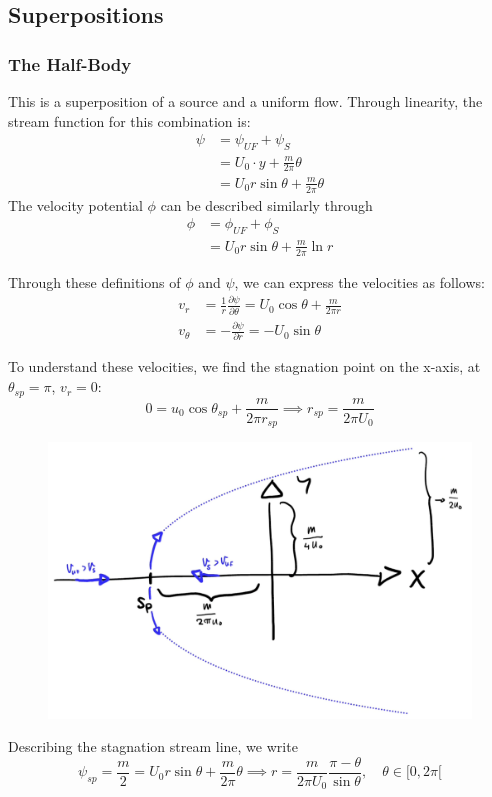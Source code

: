 \subsection{Superpositions}
\subsubsection{The Half-Body}
This is a superposition of a source and a uniform flow.
Through linearity, the stream function for this combination is:
\begin{equation*}
	\begin{split}
		\psi &= \psi_{UF} + \psi_{S}\\
		&= U_0\cdot y + \frac{m}{2\pi}\theta \\
		&= U_0r\sin\theta + \frac{m}{2\pi}\theta
	\end{split}
\end{equation*}
The velocity potential $\phi$ can be described similarly through
\begin{equation*}
	\begin{split}
		\phi &= \phi_{UF} + \phi_{S}\\
		&=U_0r\sin\theta + \frac{m}{2\pi}\ln r 
	\end{split}
\end{equation*}

Through these definitions of $\phi$ and $\psi$, we can express the velocities as follows:
\begin{equation*}
	\begin{split}
		v_r &= \frac 1r \frac{\partial \psi}{\partial \theta } = U_0 \cos\theta + \frac{m}{2\pi r}\\
		v_\theta &= - \frac{\partial \psi}{\partial r} = -U_0\sin\theta 
	\end{split}
\end{equation*}

To understand these velocities, we find the stagnation point on the x-axis, at $\theta_{sp}=\pi$, $v_r= 0$:
\begin{equation*}
	0=u_0\cos\theta_{sp} + \frac{m}{2\pi r_{sp}} \implies r_{sp} = \frac{m}{2\pi U_0}
\end{equation*}
\begin{figure}[H]
	\centering
	\includegraphics[width=0.4\linewidth]{Sketches/halfbody}
	\caption{}
	\label{fig:halfbody}
\end{figure}
Describing the stagnation stream line, we write
\begin{equation*}
	\psi_{sp} = \frac m2 = U_0 r \sin\theta + \frac{m}{2\pi}\theta \implies r = \frac{m}{2\pi U_0} \frac{\pi - \theta}{\sin\theta},\quad \theta \in[0,2\pi[
\end{equation*}

